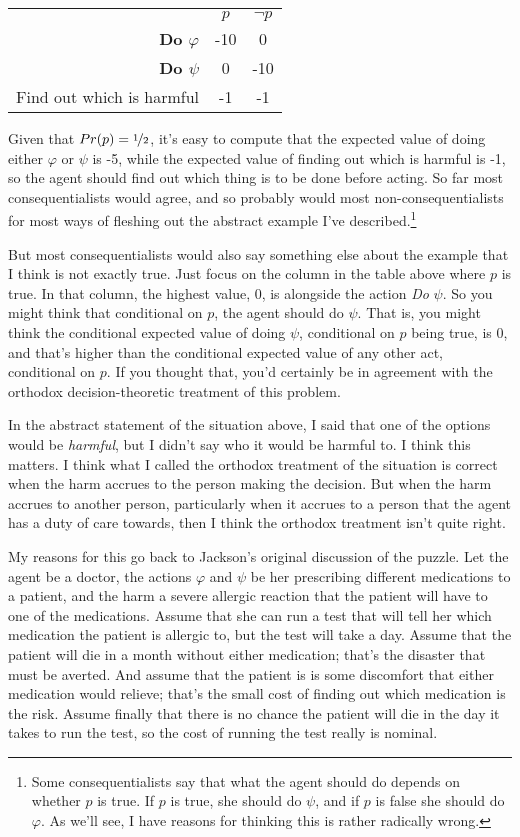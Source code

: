 \begin{center}
\begin{tabular}{r c c}
 & $p$ & $\neg p$ \\
\textbf{Do $\varphi$} & -10 & 0 \\
\textbf{Do $\psi$} & 0 & -10 \\
Find out which is harmful & -1 & -1 \\
\end{tabular}
\end{center}

\noindent Given that $Pr(p) = \nicefrac{1}{2}$, it's easy to compute that the expected value of doing either $\varphi$ or $\psi$ is -5, while the expected value of finding out which is harmful is -1, so the agent should find out which thing is to be done before acting. So far most consequentialists would agree, and so probably would most non-consequentialists for most ways of fleshing out the abstract example I've described.\footnote{Some consequentialists say that what the agent should do depends on whether $p$ is true. If $p$ is true, she should do $\psi$, and if $p$ is false she should do $\varphi$. As we'll see, I have reasons for thinking this is rather radically wrong.}

But most consequentialists would also say something else about the example that I think is not exactly true. Just focus on the column in the table above where $p$ is true. In that column, the highest value, 0, is alongside the action \textit{Do} $\psi$. So you might think that conditional on $p$, the agent should do $\psi$. That is, you might think the conditional expected value of doing $\psi$, conditional on $p$ being true, is 0, and that's higher than the conditional expected value of any other act, conditional on $p$. If you thought that, you'd certainly be in agreement with the orthodox decision-theoretic treatment of this problem.

In the abstract statement of the situation above, I said that one of the options would be \textit{harmful}, but I didn't say who it would be harmful to. I think this matters. I think what I called the orthodox treatment of the situation is correct when the harm accrues to the person making the decision. But when the harm accrues to another person, particularly when it accrues to a person that the agent has a duty of care towards, then I think the orthodox treatment isn't quite right.

My reasons for this go back to Jackson's original discussion of the puzzle. Let the agent be a doctor, the actions $\varphi$ and $\psi$ be her prescribing different medications to a patient, and the harm a severe allergic reaction that the patient will have to one of the medications. Assume that she can run a test that will tell her which medication the patient is allergic to, but the test will take a day. Assume that the patient will die in a month without either medication; that's the disaster that must be averted. And assume that the patient is is some discomfort that either medication would relieve; that's the small cost of finding out which medication is the risk. Assume finally that there is no chance the patient will die in the day it takes to run the test, so the cost of running the test really is nominal.

